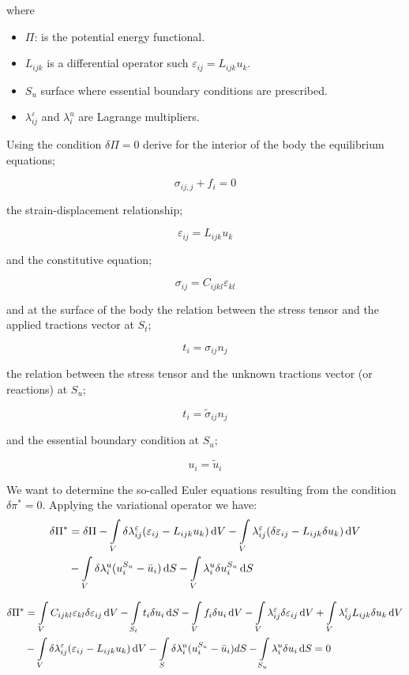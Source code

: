 where
\begin{itemize}
\item $\Pi$: is the potential energy functional.
\item $L_{ijk}$ is a differential operator such $\varepsilon_{ij} = L_{ijk} u_k$.
\item $S_u$ surface where essential boundary conditions are prescribed.
\item $\lambda_{ij}^\varepsilon $ and $\lambda_i^u$ are Lagrange multipliers.
\end{itemize}

Using the condition $\delta \Pi = 0$ derive for the interior of the body the equilibrium equations;

\[{\sigma _{ij,j}} + {f_i} = 0\]

the strain-displacement relationship;

\[{\varepsilon _{ij}} = {L_{ijk}}{u_k}\]

and the constitutive equation;

\[{\sigma _{ij}} = {C_{ijkl}}{\varepsilon _{kl}}\]

and at the surface of the body the relation between the stress tensor and the applied tractions vector at $S_t$;

\[{t_i} = {\sigma _{ij}}{n_j}\]

the relation between the stress tensor and the unknown tractions vector (or reactions) at $S_u$; 

\[{t_i} = {{\tilde \sigma }_{ij}}{n_j}\]

and the essential boundary condition at $S_u$;

\[{u_i} = {{\tilde u}_i}\]

We want to determine the so-called Euler equations resulting from the condition $\delta \pi^* = 0$. Applying the variational operator we have:
\begin{equation}
\begin{aligned}
\delta \Pi^*& = \delta \Pi  - \int\limits_V \delta \lambda_{ij}^{\varepsilon}  (\varepsilon_{ij} - L_{ijk} u_k)\dd{V}- \int\limits_V \lambda_{ij}^\varepsilon (\delta \varepsilon_{ij} - L_{ijk}\delta u_k)\dd{V} \\
&-\int\limits_V \delta \lambda_i^u (u_i^{S_u} - \bar u_i)\dd{S} - \int\limits_V \lambda _i^u \delta u_i^{S_u} \dd{S}
\end{aligned}
\end{equation}

\begin{equation}
\begin{aligned}
\delta \Pi^* &= \int\limits_V C_{ijkl} \varepsilon_{kl} \delta  \varepsilon_{ij}\dd{V} - \int\limits_{S_t} t_i \delta{u_i} \dd{S}  - \int\limits_V f_i\delta {u_i}\dd{V} - \int\limits_V \lambda_{ij}^{\varepsilon} \delta \varepsilon_{ij}\dd{V}  + \int\limits_V \lambda_{ij}^{\varepsilon} L_{ijk}\delta {u_k}\dd{V}\\
&- \int\limits_V \delta \lambda_{ij}^{\varepsilon} (\varepsilon_{ij} - L_{ijk} u_k)\dd{V} - \int\limits_S \delta \lambda_i^u (u_i^{S_u} - \bar {u}_i)dS - \int\limits_{S_u} \lambda _i^u\delta {u_i}\dd{S} = 0
\end{aligned}
\end{equation}

